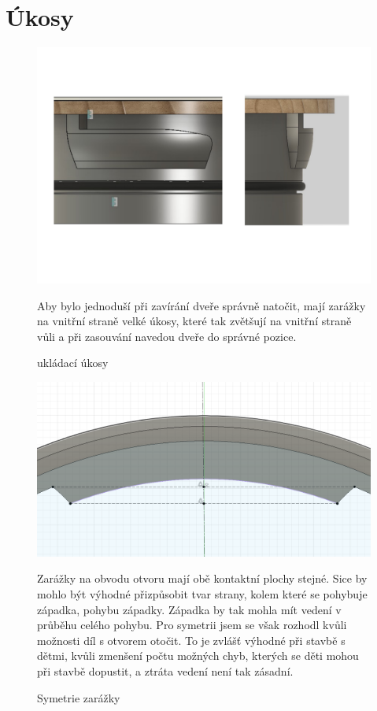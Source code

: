 {\tiny }\section{Úkosy}

\begin{figure}[htbp]  
    \centering
    \includegraphics[width=400pt]{kapitoly/obrazky/E4/ukozy/ukladaci_ukosy.pdf}
    \caption{ukládací úkosy}
    Aby bylo jednoduší při zavírání dveře správně natočit, mají zarážky na vnitřní straně velké úkosy, které tak zvětšují na vnitřní straně 
    vůli a při zasouvání navedou dveře do správné pozice.
    \label{fig:E4-ukosy}
\end{figure}

\begin{figure}[htbp]
    \centering
    \includegraphics[width=400pt]{kapitoly/obrazky/E4/ukozy/simetrie_zarazek.png}
    \caption{Symetrie zarážky}
    Zarážky na obvodu otvoru mají obě kontaktní plochy stejné. Sice by mohlo být výhodné přizpůsobit tvar strany, kolem které se pohybuje západka, 
    pohybu západky. Západka by tak mohla mít vedení v průběhu celého pohybu. Pro symetrii jsem se však rozhodl kvůli možnosti díl s otvorem otočit.
    To je zvlášť výhodné při stavbě s dětmi, kvůli zmenšení počtu možných chyb, kterých se děti mohou při stavbě dopustit, a ztráta vedení není tak zásadní.
    \label{fig:E4-simetrie_zarazky}
\end{figure}

\clearpage
\newpage